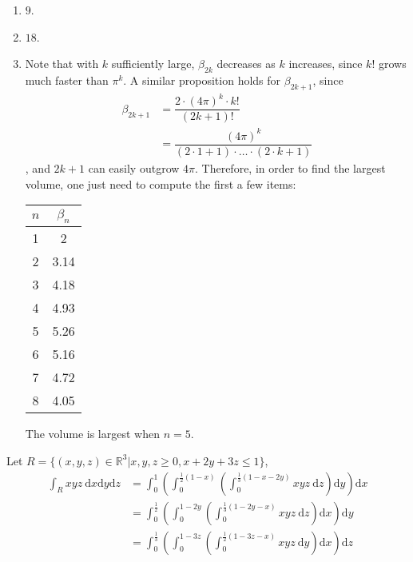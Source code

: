 \documentclass{homework}
\begin{document}
\begin{problem}{4}
\begin{enumerate}
\item $9$.
\item $18$.
\item
Note that with $k$ sufficiently large, $\beta_{2k}$ decreases as $k$ increases,
since $k!$ grows much faster than $\pi^k$. A similar proposition holds for
$\beta_{2k+1}$, since
\begin{align*}
\beta_{2k+1} &= \dfrac{2\cdot(4\pi)^k\cdot k!}{(2k+1)!} \\
&= \dfrac{(4\pi)^k}{(2\cdot1+1)\cdot\ldots\cdot(2\cdot k+1)}
\end{align*}
, and $2k+1$ can easily outgrow $4\pi$. Therefore, in order to find the largest
volume, one just need to compute the first a few items:
\begin{center}
\begin{tabular}{c|c}
$n$ & $\beta_n$ \\
\hline
1 & 2 \\
2 & 3.14 \\
3 & 4.18 \\
4 & 4.93 \\
5 & 5.26 \\
6 & 5.16 \\
7 & 4.72 \\
8 & 4.05
\end{tabular}
\end{center}
The volume is largest when $n = 5$.
\end{enumerate}
\end{problem}

\begin{problem}{5}
Let $R = \{(x,y,z) \in \mathbb{R}^3 | x,y,z\geq0, x+2y+3z \leq 1\}$,
\begin{align*}
\int_R xyz\ \mathrm{d}x\mathrm{d}y\mathrm{d}z
&=\int_0^1(\int_0^{\frac{1}{2}(1-x)}(
  \int_0^{\frac{1}{3}(1-x-2y)}xyz\ \mathrm{d}z
  )\mathrm{d}y)\mathrm{d}x\\
&=\int_0^\frac{1}{2}(\int_0^{1-2y}(
  \int_0^{\frac{1}{3}(1-2y-x)}xyz\ \mathrm{d}z
  )\mathrm{d}x)\mathrm{d}y\\
&=\int_0^\frac{1}{3}(\int_0^{1-3z}(
  \int_0^{\frac{1}{2}(1-3z-x)}xyz\ \mathrm{d}y
  )\mathrm{d}x)\mathrm{d}z
\end{align*}
\end{problem}
\end{document}
